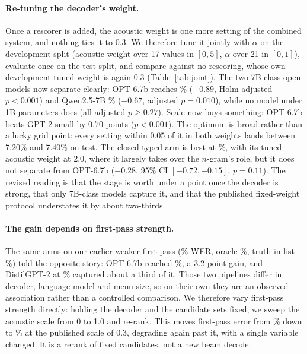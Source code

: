 \documentclass[11pt]{article}
\begin{document}
\paragraph{Re-tuning the decoder's weight.} Once a rescorer is added, the acoustic weight
is one more setting of the combined system, and nothing ties it to 0.3. We therefore tune
it jointly with $\alpha$ on the development split (acoustic weight over 17 values in
$[0, 5]$, $\alpha$ over 21 in $[0, 1]$), evaluate once on the test split, and compare
against no rescoring, whose own development-tuned weight is again 0.3
(Table~\ref{tab:joint}). The two 7B-class open models now separate clearly: OPT-6.7b
reaches \werOptJoint\% ($-0.89$, Holm-adjusted $p<0.001$) and Qwen2.5-7B \werQwenJoint\%
($-0.67$, adjusted $p=0.010$), while no model under 1B parameters does (all adjusted
$p \ge 0.27$). Scale now buys something: OPT-6.7b beats GPT-2 small by $0.70$ points
($p<0.001$). The optimum is broad rather than a lucky grid point: every setting within
0.05 of it in both weights lands between 7.20\% and 7.40\% on test. The closed typed arm
is best at \werJevJoint\%, with its tuned acoustic weight at 2.0, where it largely takes
over the $n$-gram's role, but it does not separate from OPT-6.7b ($-0.28$, 95\% CI
$[-0.72, +0.15]$, $p=0.11$). The revised reading is that the stage is worth under a
point once the decoder is strong, that only 7B-class models capture it, and that the
published fixed-weight protocol understates it by about two-thirds.

\begin{table}[t]
\centering\small
\setlength{\tabcolsep}{3pt}

\caption{The decoder's acoustic weight re-tuned jointly with $\alpha$ per arm on the
development split; test split, paired bootstrap (5{,}000, one-sided) against no
rescoring; $p_{\text{Holm}}$ over the same seven arms as Table~\ref{tab:sig}. Bold: arms
that survive correction. Open typed arms (bottom) remain at or below the baseline.}
\label{tab:joint}
\end{table}

\paragraph{The gain depends on first-pass strength.} The same arms on our earlier weaker
first pass (\werNoneWeak\% WER, oracle \oracleWerWeak\%, truth in list \truthInListWeak\%)
told the opposite story: OPT-6.7b reached \werOptWeak\%, a 3.2-point gain, and DistilGPT-2
at \werDistilWeak\% captured about a third of it. Those two pipelines differ in decoder,
language model and menu size, so on their own they are an observed association rather than
a controlled comparison. We therefore vary first-pass strength directly: holding the
decoder and the candidate sets fixed, we sweep the acoustic scale from 0 to 1.0 and
re-rank. This moves first-pass error from \fpWeakSweep\% down to \werNone\% at the
published scale of 0.3, degrading again past it, with a single variable changed. It is a
rerank of fixed candidates, not a new beam decode.
\end{document}

